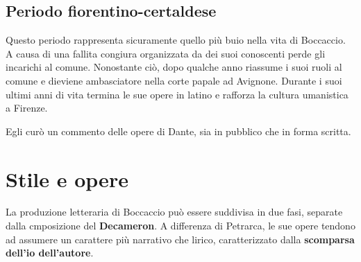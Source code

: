 \documentclass[10pt,a4paper]{article}
\begin{document}
	 \subsection{Periodo fiorentino-certaldese}

	 Questo periodo rappresenta sicuramente quello più buio nella vita di Boccaccio. A causa di una fallita congiura organizzata da dei suoi conoscenti perde gli incarichi al comune. Nonostante ciò, dopo qualche anno riassume i suoi ruoli al comune e dieviene ambasciatore nella corte papale ad Avignone. Durante i suoi ultimi anni di vita termina le sue opere in latino e rafforza la cultura umanistica a Firenze.

	 Egli curò un commento delle opere di Dante, sia in pubblico che in forma scritta.

	 \section{Stile e opere}

	 La produzione letteraria di Boccaccio può essere suddivisa in due fasi, separate dalla cmposizione del \textbf{Decameron}. A differenza di Petrarca, le sue opere tendono ad assumere un carattere più narrativo che lirico, caratterizzato dalla \textbf{scomparsa dell'io dell'autore}.

	 
\end{document}
